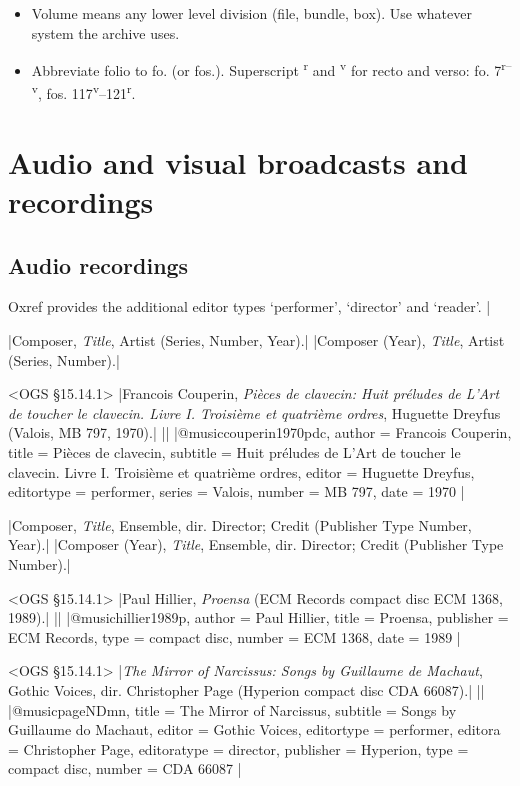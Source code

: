 \documentclass[extrafontsizes,11pt,a4paper,oneside]{memoir}
\newcommand*{\lit}[1]{\textsf{#1}}
\newcommand*{\code}[1]{`\textsf{#1}'}
\begin{document}
\begin{itemize}
  \item Volume means any lower level division (file, bundle, box). Use whatever system the archive uses.
  \item Abbreviate folio to fo. (or fos.). Superscript \textsuperscript{r} and \textsuperscript{v} for recto and verso: fo. 7\textsuperscript{r--v}, fos. 117\textsuperscript{v}--121\textsuperscript{r}.
\end{itemize}

\chapter{Audio and visual broadcasts and recordings}\label{sec:audiovideo}

\section{Audio recordings}

Oxref provides the additional editor types \code{performer}, \code{director} and \code{reader}.
|

\specs
|Composer, \emph{Title}, Artist (Series, Number, Year).|%
|Composer (Year), \emph{Title}, Artist (Series, Number).|

\bibexample<OGS \S15.14.1>
|Francois Couperin, \emph{Pièces de clavecin: Huit préludes de L'Art de toucher le clavecin. Livre I. Troisième et quatrième ordres}, Huguette Dreyfus (Valois, MB 797, 1970).|%
||%
|@music{couperin1970pdc,
  author = {Francois Couperin},
  title = {Pièces de clavecin},
  subtitle = {Huit préludes de L'Art de toucher le clavecin. Livre I. Troisième et quatrième ordres},
  editor = {Huguette Dreyfus},
  editortype = {performer},
  series = {Valois},
  number = {MB 797},
  date = {1970}
}|

\specs
|Composer, \emph{Title}, Ensemble, \lit{dir.} Director; Credit (Publisher Type Number, Year).|%
|Composer (Year), \emph{Title}, Ensemble, \lit{dir.} Director; Credit (Publisher Type Number).|

\bibexample<OGS \S15.14.1>
|Paul Hillier, \emph{Proensa} (ECM Records compact disc ECM 1368, 1989).|%
||%
|@music{hillier1989p,
  author = {Paul Hillier},
  title = {Proensa},
  publisher = {ECM Records},
  type = {compact disc},
  number = {ECM 1368},
  date = {1989}
}|

\bibexample<OGS \S15.14.1>
|\emph{The Mirror of Narcissus: Songs by Guillaume de Machaut}, Gothic Voices, dir. Christopher Page (Hyperion compact disc CDA 66087).|%
||%
|@music{pageNDmn,
  title = {The Mirror of Narcissus},
  subtitle = {Songs by Guillaume do Machaut},
  editor = {Gothic Voices},
  editortype = {performer},
  editora = {Christopher Page},
  editoratype = {director},
  publisher = {Hyperion},
  type = {compact disc},
  number = {CDA 66087}
}|
\end{document}
